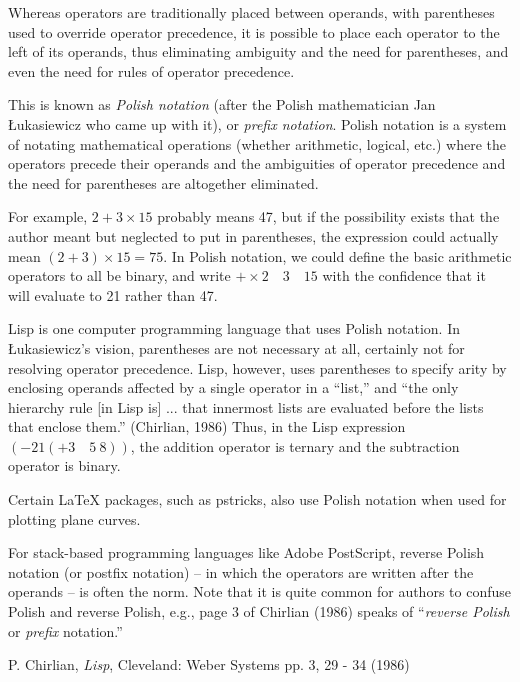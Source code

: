 \documentclass[12pt]{article}
\begin{document}
Whereas operators are traditionally placed between operands, with parentheses used to override operator precedence, it is possible to place each operator to the left of its operands, thus eliminating ambiguity and the need for parentheses, and even the need for rules of operator precedence.

This is known as \emph{Polish notation} (after the Polish mathematician Jan \L{}ukasiewicz who came up with it), or \emph{prefix notation}. Polish notation is a system of notating mathematical operations (whether arithmetic, logical, etc.) where the operators precede their operands and the ambiguities of operator precedence and the need for parentheses are altogether eliminated.

For example, $2 + 3 \times 15$ probably means 47, but if the possibility exists that the author meant but neglected to put in parentheses, the expression could actually mean $(2 + 3) \times 15 = 75$. In Polish notation, we could define the basic arithmetic operators to all be binary, and write $+ \times 2 \quad 3 \quad 15$ with the confidence that it will evaluate to 21 rather than 47.

Lisp is one computer programming language that uses Polish notation. In \L{}ukasiewicz's vision, parentheses are not necessary at all, certainly not for resolving operator precedence. Lisp, however, uses parentheses to specify arity by enclosing operands affected by a single operator in a ``list,'' and ``the only hierarchy rule [in Lisp is] ... that innermost lists are evaluated before the lists that enclose them.'' (Chirlian, 1986) Thus, in the Lisp expression $(- 21 (+ 3 \quad 5 \ 8))$, the addition operator is ternary and the subtraction operator is binary.

Certain LaTeX packages, such as pstricks, also use Polish notation when used for plotting plane curves.

For stack-based programming languages like Adobe PostScript, reverse Polish notation (or postfix notation) -- in which the operators are written after the operands -- is often the norm. Note that it is quite common for authors to confuse Polish and reverse Polish, e.g., page 3 of Chirlian (1986) speaks of ``{\it reverse Polish} or {\it prefix} notation.''

\begin{thebibliography}{1}
 P. Chirlian, {\it Lisp}, Cleveland: Weber Systems pp. 3, 29 - 34 (1986)
\end{thebibliography}
\end{document}
